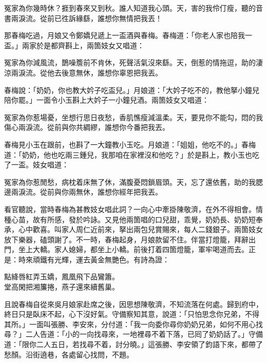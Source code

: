 \begin{myquote}
冤家為你幾時休？捱到春來又到秋。誰人知道我心頭。天，害的我伶仃瘦，聽的音書兩淚流。從前已徃訴緣繇，誰想你無情把我丟！
\end{myquote}

那春梅吃過，月娘又令鄭嬌兒遞上一盃酒與春梅。春梅道：「你老人家也陪我一盃。」兩家於是都齊斟上，兩箇妓女又唱道：

\begin{myquote}
冤家為你減風流，鵲噪簷前不肯休，死聲活氣沒來繇。天，倒惹的情拖逗，助的淒涼兩淚流。從他去後意無休，誰想你辜恩把我丟。
\end{myquote}

春梅說：「奶奶，你也教大妗子吃盃兒。」月娘道：「大妗子吃不的，教他拏小鐘兒陪你罷。」一面令小玉斟上大妗子一小鐘兒酒。兩箇妓女又唱道：

\begin{myquote}
冤家為你惹場憂，坐想行思日夜愁，香肌憔瘦減溫柔。天，要見你不能勾，悶的我傷心兩淚流。從前與你共綢繆，誰想你今番把我丟。
\end{myquote}

春梅見小玉在跟前，也斟了一大鐘教小玉吃。{}月娘道：「姐姐，他吃不的。」春梅道：「奶奶，他也吃兩三鍾兒，我那咱在家裡沒和他吃？」{}於是斟上，教小玉也吃了一盃。妓女唱道：

\begin{myquote}
冤家為你惹閒愁，病枕着床無了休，滿腹憂悶鎖眉頭。天，忘了還依舊，助的我腮邊兩淚流。從前與你兩無休，誰想你經年把我丟。
\end{myquote}

看官聽說，當時春梅為甚教妓女唱此詞？一向心中牽掛陳敬濟，在外不得相會。情種心苗，故有所感，發於吟詠。又見他兩箇唱的口兒甜，乖覺，奶奶長、奶奶短奉承，心中歡喜。叫家人周仁近前來，拏出兩包兒賞賜來，每人二錢銀子。兩箇妓女放下樂器，磕頭謝了。不一時，春梅起身，月娘款留不住。伴當打燈籠，拜辭出門，坐上大轎。家人媳婦，都坐上小轎。前後打着四箇燈籠，軍牢喝道而去。正是：時來頑鐵有光輝，運去黃金無艷色。有詩為證：

\begin{myquote}
點絳唇紅弄玉嬌，鳳凰飛下品鸞簫。\\堂高閑把湘簾捲，燕子還來續舊巢。
\end{myquote}

且說春梅自從來吳月娘家赴席之後，因思想陳敬濟，不知流落在何處。{}歸到府中，終日只是臥床不起，心下沒好氣。守備察知其意，{}說道：「只怕思念你兄弟，不得其所。」一面叫張勝、李安來，分付道：「我一向委你尋你奶奶兄弟，如何不用心找尋？」二人告道：「小的一向找尋來，一地裡尋不着下落，已囘了奶奶話了。」守備道：「限你二人五日，若找尋不着，討分曉。」這張勝、李安領了鈞語下來，都帶了愁顏。沿街遶巷，各處留心找問，不題。

